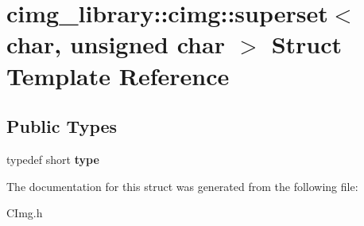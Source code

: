 \hypertarget{structcimg__library_1_1cimg_1_1superset_3_01char_00_01unsigned_01char_01_4}{\section{cimg\-\_\-library\-:\-:cimg\-:\-:superset$<$ char, unsigned char $>$ Struct Template Reference}
\label{structcimg__library_1_1cimg_1_1superset_3_01char_00_01unsigned_01char_01_4}
}
\subsection*{Public Types}
\begin{DoxyCompactItemize}
\item 
\hypertarget{structcimg__library_1_1cimg_1_1superset_3_01char_00_01unsigned_01char_01_4_ac6c7dc5dfdfebb354202859f72149288}{typedef short {\bfseries type}}\label{structcimg__library_1_1cimg_1_1superset_3_01char_00_01unsigned_01char_01_4_ac6c7dc5dfdfebb354202859f72149288}

\end{DoxyCompactItemize}


The documentation for this struct was generated from the following file\-:\begin{DoxyCompactItemize}
\item 
C\-Img.\-h\end{DoxyCompactItemize}

